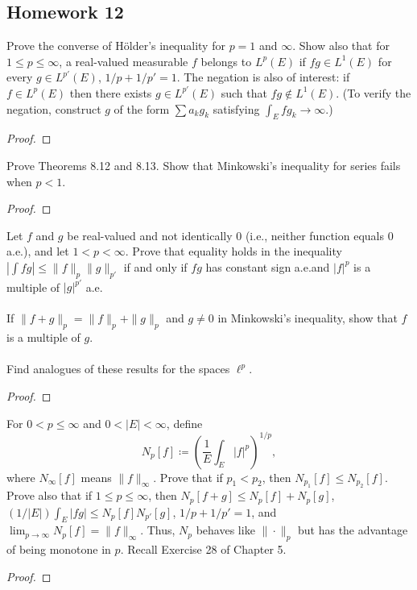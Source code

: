 \subsection{Homework 12}
\begin{problem}
Prove the converse of Hölder's inequality for $p=1$ and $\infty$. Show also
that for $1\leq p\leq\infty$, a real-valued measurable $f$ belongs to
$L^p(E)$ if $fg\in L^1(E)$ for every $g\in L^{p'}(E)$, $1/p+1/p'=1$. The
negation is also of interest: if $f\in L^p(E)$ then there exists $g\in
L^{p'}(E)$ such that $fg\notin L^1(E)$. (To verify the negation, construct
$g$ of the form $\sum a_kg_k$ satisfying $\int_E fg_k\to\infty$.)
\end{problem}
\begin{proof}
\end{proof}

\begin{problem}
Prove Theorems 8.12 and 8.13. Show that Minkowski’s inequality for series
fails when $p<1$.
\end{problem}
\begin{proof}
\end{proof}

\begin{problem}
Let $f$ and $g$ be real-valued and not identically $0$ (i.e., neither
function equals $0$ a.e.), and let $1<p<\infty$. Prove that equality holds
in the inequality $|\int fg|\leq\|f\|_p\|g\|_{p'}$ if and only if
$fg$ has constant sign a.e.\@ and $|f|^p$ is a multiple of $|g|^{p'}$ a.e.
\\\\
If $\|f+g\|_p=\|f\|_p+\|g\|_{p}$ and $g\neq 0$ in Minkowski's inequality,
show that $f$ is a multiple of $g$.
\\\\
Find analogues of these results for the spaces $\ell^p$.
\end{problem}
\begin{proof}
\end{proof}

\begin{problem}
For $0<p\leq\infty$ and $0<|E|<\infty$, define
\[
N_p[f]\coloneq\left(\frac{1}{E}\int_E|f|^p\right)^{1/p},
\]
where $N_\infty[f]$ means $\|f\|_\infty$. Prove that if $p_1<p_2$, then
$N_{p_1}[f]\leq N_{p_2}[f]$. Prove also that if $1\leq p\leq \infty$, then
$N_p[f+g]\leq N_p[f]+N_p[g]$, $(1/|E|)\int_E|fg|\leq N_p[f]N_{p'}[g]$,
$1/p+1/p'=1$, and $\lim_{p\to\infty} N_p[f]=\|f\|_\infty$. Thus, $N_p$
behaves like $\|\cdot\|_p$ but has the advantage of being monotone in
$p$. Recall Exercise 28 of Chapter 5.
\end{problem}
\begin{proof}
\end{proof}

